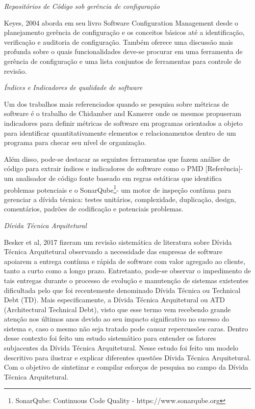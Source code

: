 \documentclass[
	12pt,				%
	openright,			%
	twoside,			%
	a4paper,			%
	english,			%
	french,				%
	spanish,			%
	brazil,				%
	]{abntex2}
\begin{document}
\emph{Repositórios de Código sob gerência de configuração }

Keyes, 2004 aborda em seu livro \textquotedbl{}Software Configuration
Management\textquotedbl{} desde o planejamento gerência de configuração
e os conceitos básicos até a identificação, verificação e auditoria
de configuração. Também oferece uma discussão mais profunda sobre
o quais funcionalidades deve-se procurar em uma ferramenta de gerência
de configuração e uma lista conjuntos de ferramentas para controle
de revisão. 

\emph{Índices e Indicadores de qualidade de software }

Um dos trabalhos mais referenciados quando se pesquisa sobre métricas
de software é o trabalho de Chidamber and Kamerer onde os mesmos propuseram
indicadores para definir métricas de software em programas orientados
a objeto para identificar quantitativamente elementos e relacionamentos
dentro de um programa para checar seu nível de organização. 

Além disso, pode-se destacar as seguintes ferramentas que fazem análise
de código para extrair índices e indicadores de software como o PMD
{[}Referência{]}- um analisador de código fonte baseado em regras
estáticas que identifica problemas potenciais e o SonarQube\footnote{SonarQube: Continuous Code Quality - https://www.sonarqube.org}-
um motor de inspeção contínua para gerenciar a dívida técnica: testes
unitários, complexidade, duplicação, design, comentários, padrões
de codificação e potenciais problemas. 

\emph{Dívida Técnica Arquitetural }

Besker et al, 2017 fizeram um revisão sistemática de literatura sobre
Dívida Técnica Arquitetural observando a necessidade das empresas
de software apoiarem a entrega contínua e rápida de software com valor
agregado ao cliente, tanto a curto como a longo prazo. Entretanto,
pode-se observar o impedimento de tais entregas durante o processo
de evolução e manutenção de sistemas existentes dificultada pelo que
foi recentemente denominado Dívida Técnica ou Technical Debt (TD).
Mais especificamente, a Dívida Técnica Arquitetural ou ATD (Architectural
Technical Debt), visto que esse termo vem recebendo grande atenção
nos últimos anos devido ao seu impacto significativo no sucesso do
sistema e, caso o mesmo não seja tratado pode causar repercussões
caras. Dentro desse contexto foi feito um estudo sistemático para
entender os fatores subjacentes da Dívida Técnica Arquitetural. Nesse
estudo foi feito um modelo descritivo para ilustrar e explicar diferentes
questões Dívida Técnica Arquitetural. Com o objetivo de sintetizar
e compilar esforços de pesquisa no campo da Dívida Técnica Arquitetural.
\end{document}
